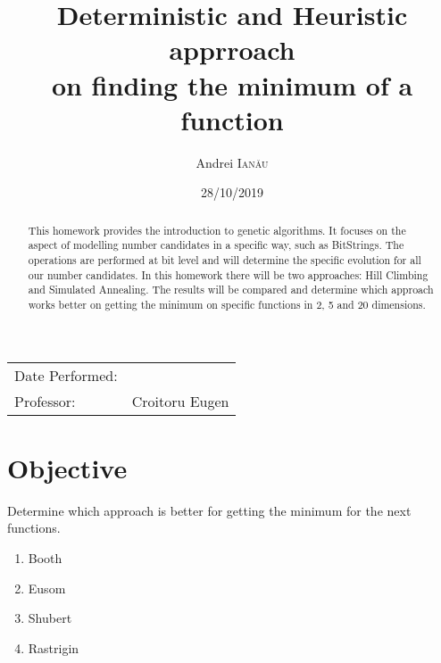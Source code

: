 \documentclass{article}
\title{Deterministic and Heuristic apprroach \\ on finding the minimum of a function} %
\author{Andrei \textsc{Ianău}} %
\begin{document}
\maketitle %

\begin{center}
\begin{tabular}{l r}
Date Performed: & \date{28/10/2019} \\ %
Professor: & Croitoru Eugen %
\end{tabular}
\end{center}



\begin{abstract}

This homework provides the introduction to genetic algorithms. It focuses on the aspect of modelling number candidates in a specific way, such as BitStrings. The operations are performed at bit level and will determine the specific evolution for all our number candidates. In this homework there will be two approaches: Hill Climbing and Simulated Annealing. The results will be compared and determine which approach works better on getting the minimum on specific functions in 2, 5 and 20 dimensions.

\end{abstract}


\section{Objective}

Determine which approach is better for getting the minimum for the next functions.
\begin{enumerate}
	\item Booth
	\item Eusom
	\item Shubert
	\item Rastrigin
\end{enumerate}
\end{document}
